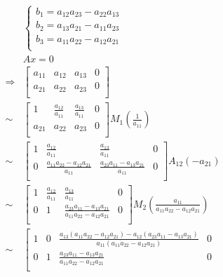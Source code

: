 \documentclass{article}
\begin{document}
~

\begin{equation*}
    \begin{split}
        &\begin{cases}
            b_1=a_{12}a_{23}-a_{22}a_{13}\\
            b_2=a_{13}a_{21}-a_{11}a_{23}\\
            b_3=a_{11}a_{22}-a_{12}a_{21}\\
        \end{cases}\\
        &Ax=0\\
        \Rightarrow &\left[\begin{array}{ccc|c}
            a_{11}&a_{12}&a_{13}&0\\
            a_{21}&a_{22}&a_{23}&0\\
        \end{array}\right]\\
        \sim&\left[\begin{array}{ccc|c}
            1&\frac{a_{12}}{a_{11}}&\frac{a_{13}}{a_{11}}&0\\
            a_{21}&a_{22}&a_{23}&0\\
        \end{array}\right]M_1(\frac{1}{a_{11}})\\
        \sim&\left[\begin{array}{ccc|c}
            1&\frac{a_{12}}{a_{11}}&\frac{a_{13}}{a_{11}}&0\\
            0&\frac{a_{11}a_{22}-a_{12}a_{21}}{a_{11}}&\frac{a_{23}a_{11}-a_{13}a_{21}}{a_{11}}&0\\
        \end{array}\right]A_{12}(-a_{21})\\
        \sim&\left[\begin{array}{ccc|c}
            1&\frac{a_{12}}{a_{11}}&\frac{a_{13}}{a_{11}}&0\\
            0&1&\frac{a_{23}a_{11}-a_{13}a_{21}}{a_{11}a_{22}-a_{12}a_{21}}&0\\
        \end{array}\right]M_2(\frac{a_{11}}{a_{11}a_{22}-a_{12}a_{21}})\\
        \sim&\left[\begin{array}{ccc|c}
            1&0&\frac{a_{13}(a_{11}a_{22}-a_{12}a_{21})-a_{12}(a_{23}a_{11}-a_{13}a_{21})}{a_{11}(a_{11}a_{22}-a_{12}a_{21})}&0\\
            0&1&\frac{a_{23}a_{11}-a_{13}a_{21}}{a_{11}a_{22}-a_{12}a_{21}}&0\\

\end{array}
\end{split}
\end{equation*}
\end{document}
